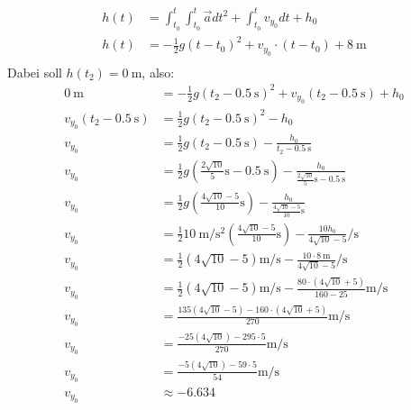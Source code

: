 \documentclass[sectionformat = aufgabe]{gadsescript}
\begin{document}
\begin{enumerate}[label=\alph*)]
		\begin{align*}
			h(t) &= \int_{t_0}^{t} \int_{t_0}^{t} \vec a dt^2 + \int_{t_0}^{t} v_{y_0} dt + h_0\\
			h(t) &= -\frac{1}{2} g(t- t_0)^2 + v_{y_0} \cdot (t-t_0) + \qty{8}{\metre}\\
		\end{align*}
		Dabei soll $ h(t_2) = \qty{0}{\metre} $, also:
		\begin{align*}
			\qty{0}{\metre} &= -\frac{1}{2}g\left(t_2 - \qty{0.5}{\second}\right)^2 + v_{y_0}\left(t_2 - \qty{0.5}{\second}\right) + h_0\\
			v_{y_0}(t_2 - \qty{0.5}{\second}) &= \frac{1}{2}g\left(t_2 - \qty{0.5}{\second}\right)^2 - h_0\\
			v_{y_0} &= \frac{1}{2}g\left(t_2 - \qty{0.5}{\second}\right) - \frac{h_0}{t_2 - \qty{0.5}{\second}}\\
			v_{y_0} &= \frac{1}{2}g\left(\frac{2\sqrt{10}}{5}\unit{\second} - \qty{0.5}{\second}\right) - \frac{h_0}{\frac{2\sqrt{10}}{5}\unit{\second} - \qty{0.5}{\second}}\\
			v_{y_0} &= \frac{1}{2}g\left(\frac{4\sqrt{10} - 5}{10}\unit{\second}\right) - \frac{h_0}{\frac{4\sqrt{10} - 5}{10}\unit{\second} }\\
			v_{y_0} &= \frac{1}{2}\qty{10}{\metre\per\square\second}\left(\frac{4\sqrt{10} - 5}{10}\unit{\second}\right) - \frac{10h_0}{4\sqrt{10} - 5}\unit{\per\second} \\
			v_{y_0} &= \frac{1}{2}\left(4\sqrt{10} - 5\right)\unit{\metre\per\second} - \frac{10\cdot\qty{8}{\metre}}{4\sqrt{10} - 5}\unit{\per\second} \\
			v_{y_0} &= \frac{1}{2}\left(4\sqrt{10} - 5\right)\unit{\metre\per\second} - \frac{80\cdot \left( 4\sqrt{10} + 5\right)}{160 - 25}\unit{\metre\per\second} \\
			v_{y_0} &= \frac{135\left(4\sqrt{10} - 5\right) - 160\cdot \left( 4\sqrt{10} + 5\right)}{270}\unit{\metre\per\second} \\
			v_{y_0} &= \frac{-25(4\sqrt{10}) - 295\cdot5}{270}\unit{\metre\per\second} \\
			v_{y_0} &= \frac{-5(4\sqrt{10}) - 59\cdot5}{54}\unit{\metre\per\second} \\
			v_{y_0} &\approx -6.634  \\
		\end{align*}
\end{enumerate}
\end{document}
